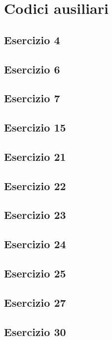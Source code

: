 \section{Codici ausiliari}

\subsection{Esercizio 4}


\subsection{Esercizio 6}


\subsection{Esercizio 7}


\subsection{Esercizio 15}


\subsection{Esercizio 21}


\subsection{Esercizio 22}


\subsection{Esercizio 23}


\subsection{Esercizio 24}


\subsection{Esercizio 25}


\subsection{Esercizio 27}


\subsection{Esercizio 30}

